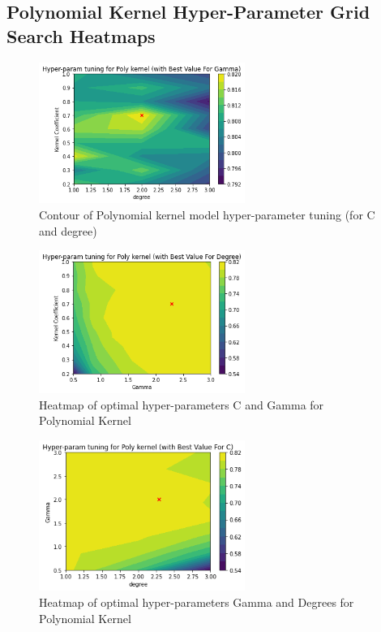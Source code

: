\subsection{Polynomial Kernel Hyper-Parameter Grid Search Heatmaps}\label{app:poly_hp}
\begin{figure}[h!]
    \centering
    \includegraphics[width=0.6\textwidth]{figures/final/poly_c_d.png}
    \caption{\label{fig:poly_hp_c_d} Contour of Polynomial kernel model hyper-parameter tuning (for C and degree)}
\end{figure}
\begin{figure}[h!]
    \centering
    \includegraphics[width=0.6\textwidth]{figures/final/poly_c_g.png}
    \caption{\label{fig:poly_c_g} Heatmap of optimal hyper-parameters C and Gamma for Polynomial Kernel}
\end{figure}
\begin{figure}[h!]
    \centering
    \includegraphics[width=0.6\textwidth]{figures/final/poly_g_d.png}
    \caption{\label{fig:poly_g_d} Heatmap of optimal hyper-parameters Gamma and Degrees for Polynomial Kernel}
\end{figure}
\newpage

